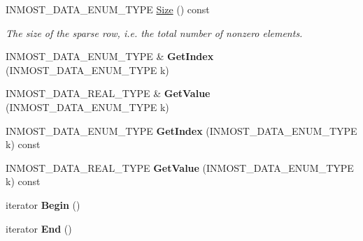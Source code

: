 \begin{DoxyCompactItemize}
\item 
\hypertarget{classINMOST_1_1Solver_1_1Row_aa1e5f7bccac23fee20de403374b5cc65}{I\-N\-M\-O\-S\-T\-\_\-\-D\-A\-T\-A\-\_\-\-E\-N\-U\-M\-\_\-\-T\-Y\-P\-E \hyperlink{classINMOST_1_1Solver_1_1Row_aa1e5f7bccac23fee20de403374b5cc65}{Size} () const }\label{classINMOST_1_1Solver_1_1Row_aa1e5f7bccac23fee20de403374b5cc65}

\begin{DoxyCompactList}\small\item\em The size of the sparse row, i.\-e. the total number of nonzero elements. \end{DoxyCompactList}\item 
\hypertarget{classINMOST_1_1Solver_1_1Row_aeeaec59f6d6f5e8eb96cd2f4dfbf1f45}{I\-N\-M\-O\-S\-T\-\_\-\-D\-A\-T\-A\-\_\-\-E\-N\-U\-M\-\_\-\-T\-Y\-P\-E \& {\bfseries Get\-Index} (I\-N\-M\-O\-S\-T\-\_\-\-D\-A\-T\-A\-\_\-\-E\-N\-U\-M\-\_\-\-T\-Y\-P\-E k)}\label{classINMOST_1_1Solver_1_1Row_aeeaec59f6d6f5e8eb96cd2f4dfbf1f45}

\item 
\hypertarget{classINMOST_1_1Solver_1_1Row_aa55f0df7ce1445b8a3141c45b78839c1}{I\-N\-M\-O\-S\-T\-\_\-\-D\-A\-T\-A\-\_\-\-R\-E\-A\-L\-\_\-\-T\-Y\-P\-E \& {\bfseries Get\-Value} (I\-N\-M\-O\-S\-T\-\_\-\-D\-A\-T\-A\-\_\-\-E\-N\-U\-M\-\_\-\-T\-Y\-P\-E k)}\label{classINMOST_1_1Solver_1_1Row_aa55f0df7ce1445b8a3141c45b78839c1}

\item 
\hypertarget{classINMOST_1_1Solver_1_1Row_aadebc4bfba05b2f5cb274dc904c5ca2a}{I\-N\-M\-O\-S\-T\-\_\-\-D\-A\-T\-A\-\_\-\-E\-N\-U\-M\-\_\-\-T\-Y\-P\-E {\bfseries Get\-Index} (I\-N\-M\-O\-S\-T\-\_\-\-D\-A\-T\-A\-\_\-\-E\-N\-U\-M\-\_\-\-T\-Y\-P\-E k) const }\label{classINMOST_1_1Solver_1_1Row_aadebc4bfba05b2f5cb274dc904c5ca2a}

\item 
\hypertarget{classINMOST_1_1Solver_1_1Row_a8078b3435a0d2fef8ee285ed045a6cd2}{I\-N\-M\-O\-S\-T\-\_\-\-D\-A\-T\-A\-\_\-\-R\-E\-A\-L\-\_\-\-T\-Y\-P\-E {\bfseries Get\-Value} (I\-N\-M\-O\-S\-T\-\_\-\-D\-A\-T\-A\-\_\-\-E\-N\-U\-M\-\_\-\-T\-Y\-P\-E k) const }\label{classINMOST_1_1Solver_1_1Row_a8078b3435a0d2fef8ee285ed045a6cd2}

\item 
\hypertarget{classINMOST_1_1Solver_1_1Row_a04f7f359a9ec0a3ae0c4b74586e25398}{iterator {\bfseries Begin} ()}\label{classINMOST_1_1Solver_1_1Row_a04f7f359a9ec0a3ae0c4b74586e25398}

\item 
\hypertarget{classINMOST_1_1Solver_1_1Row_ace5b0538e549c621956412c3f6edce16}{iterator {\bfseries End} ()}\label{classINMOST_1_1Solver_1_1Row_ace5b0538e549c621956412c3f6edce16}


\end{DoxyCompactItemize}
